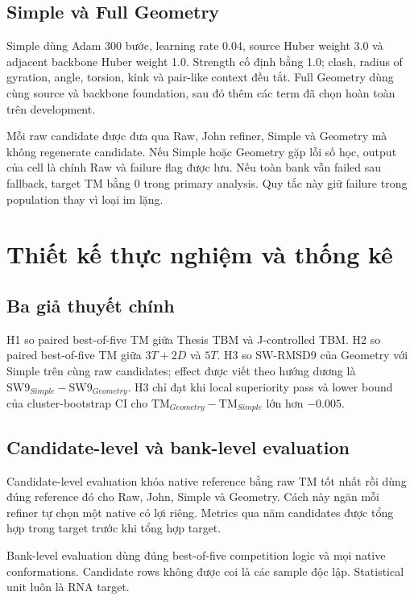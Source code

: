\documentclass[12pt,a4paper,oneside]{report}
\begin{document}
\section{Simple và Full Geometry}

Simple dùng Adam 300 bước, learning rate 0.04, source Huber weight 3.0 và adjacent
backbone Huber weight 1.0. Strength cố định bằng 1.0; clash, radius of gyration, angle,
torsion, kink và pair-like context đều tắt. Full Geometry dùng cùng source và backbone
foundation, sau đó thêm các term đã chọn hoàn toàn trên development.

Mỗi raw candidate được đưa qua Raw, John refiner, Simple và Geometry mà không regenerate
candidate. Nếu Simple hoặc Geometry gặp lỗi số học, output của cell là chính Raw và
failure flag được lưu. Nếu toàn bank vẫn failed sau fallback, target TM bằng 0 trong
primary analysis. Quy tắc này giữ failure trong population thay vì loại im lặng.

\chapter{Thiết kế thực nghiệm và thống kê}

\section{Ba giả thuyết chính}

H1 so paired best-of-five TM giữa Thesis TBM và J-controlled TBM. H2 so paired
best-of-five TM giữa $3T+2D$ và $5T$. H3 so SW-RMSD9 của Geometry với Simple trên cùng
raw candidates; effect được viết theo hướng dương là
$\mathrm{SW9}_{Simple}-\mathrm{SW9}_{Geometry}$. H3 chỉ đạt khi local superiority pass
và lower bound của cluster-bootstrap CI cho
$\mathrm{TM}_{Geometry}-\mathrm{TM}_{Simple}$ lớn hơn $-0.005$.

\section{Candidate-level và bank-level evaluation}

Candidate-level evaluation khóa native reference bằng raw TM tốt nhất rồi dùng đúng
reference đó cho Raw, John, Simple và Geometry. Cách này ngăn mỗi refiner tự chọn một
native có lợi riêng. Metrics qua năm candidates được tổng hợp trong target trước khi
tổng hợp target.

Bank-level evaluation dùng đúng best-of-five competition logic và mọi native
conformations. Candidate rows không được coi là các sample độc lập. Statistical unit
luôn là RNA target.
\end{document}
